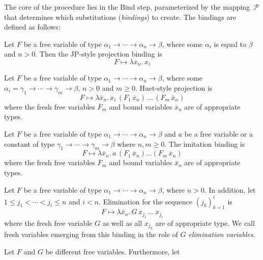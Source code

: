 %
%
The core of the procedure lies in the \textsf{Bind} step, parameterized
by the mapping~$\mathcal{P}$ that determines which substitutions (\emph{bindings}) 
to create. The bindings are defined as follows:
%
\begin{description}[itemsep=1\jot]
    \item[JP-style projection for $F$] Let $F$ be a free variable of
    type $\alpha_1 \rightarrow \cdots \rightarrow \alpha_n \rightarrow \beta$, where
    some $\alpha_i$ is equal to $\beta$ and $n > 0$. Then the JP-style projection binding is
        \[F \mapsto \lambda \overline{x}_n.\,x_i\]
    \item[Huet-style projection for $F$] Let $F$ be a free variable of type $\alpha_1
    \rightarrow \cdots \rightarrow \alpha_n \rightarrow \beta$, where some $\alpha_i
    = \gamma_1 \rightarrow \cdots \rightarrow \gamma_m \rightarrow \beta$, $n > 0$ and $m \geq 0$. Huet-style projection is
    \[F \mapsto \lambda \overline{x}_n. \, x_i \, (F_1 \, \overline{x}_n) \, \ldots \, (F_m \, \overline{x}_n)\]
    where the fresh free variables $\overline{F}_m$ and bound variables $\overline{x}_n$ are of appropriate types.
    \item[Imitation of $a$ for $F$] 
     Let $F$ be a free variable of type $\alpha_1 \rightarrow
    \cdots \rightarrow \alpha_n \rightarrow \beta$ and $a$ be a free variable or a constant
    of type $\gamma_1 \rightarrow \cdots
    \rightarrow \gamma_m \rightarrow \beta$ where $n,m \geq 0$. The imitation binding is
    \[F \mapsto \lambda \overline{x}_n. \, a \, (F_1 \, \overline{x}_n) \ldots
    (F_m \, \overline{x}_n)\] where the fresh free variables $\overline{F}_m $ and
    bound variables $\overline{x}_n$ are of appropriate types.
    \item[Elimination for $F$] Let $F$ be a free variable of type $\alpha_1 \rightarrow
    \cdots \rightarrow \alpha_n \rightarrow \beta$, where $n >0$. In addition, let $1 \leq j_1 < \cdots < j_i \leq n$ and $i<n$. Elimination
    for the sequence $(j_k)_{k=1}^i$ is
    \[ F \mapsto \lambda \overline{x}_n. \, G \, x_{j_1} \, \ldots \, x_{j_i}\]
    where the fresh free variable $G$ as well as all $x_{j_k}$ are of appropriate type.
    We call fresh variables emerging from this binding in the role of $G$ 
    \emph{elimination variables}.
    \item[Identification for $F$ and $G$] Let $F$ and $G$ be different free variables. Furthermore, let

\end{description}
